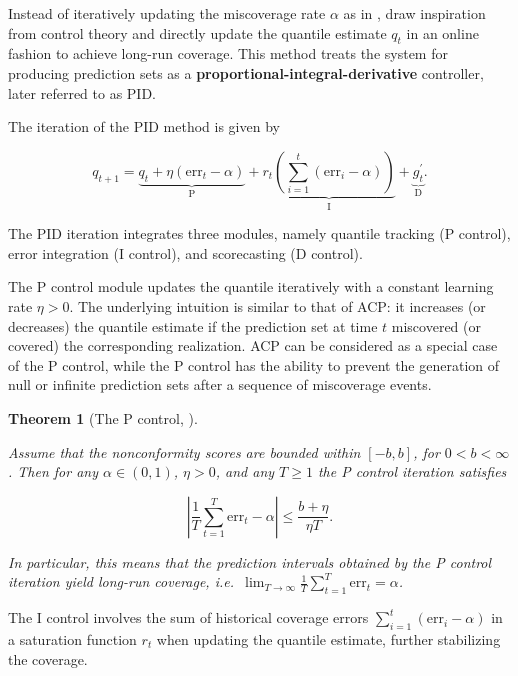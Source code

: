 \documentclass[
  11pt,
  a4paper,
]{article}
\theoremstyle{plain}
\theoremstyle{plain}
\newtheorem{theorem}{Theorem}[section]
\theoremstyle{remark}
\begin{document}
Instead of iteratively updating the miscoverage rate \(\alpha\) as in
\textcite{gibbs2021}, \textcite{angelopoulos2024} draw inspiration from
control theory and directly update the quantile estimate \(q_t\) in an
online fashion to achieve long-run coverage. This method treats the
system for producing prediction sets as a
\textbf{proportional-integral-derivative} controller, later referred to
as PID.

The iteration of the PID method is given by

\[
q_{t+1}=\underbrace{q_t+\eta\left(\mathrm{err}_t-\alpha\right)}_{\mathrm{P}}+\underbrace{r_t\left(\sum_{i=1}^t \left(\mathrm{err}_i-\alpha\right)\right)}_{\mathrm{I}}+\underbrace{g_t^{\prime}}_{\mathrm{D}}.
\]

The PID iteration integrates three modules, namely quantile tracking (P
control), error integration (I control), and scorecasting (D control).

The P control module updates the quantile iteratively with a constant
learning rate \(\eta > 0\). The underlying intuition is similar to that
of ACP: it increases (or decreases) the quantile estimate if the
prediction set at time \(t\) miscovered (or covered) the corresponding
realization. ACP can be considered as a special case of the P control,
while the P control has the ability to prevent the generation of null or
infinite prediction sets after a sequence of miscoverage events.

\begin{theorem}[The P control,
\textcite{angelopoulos2024}]\protect\hypertarget{thm-pid_p}{}\label{thm-pid_p}

Assume that the nonconformity scores are bounded within \([-b, b]\), for
\(0<b<\infty\). Then for any \(\alpha \in (0,1)\), \(\eta > 0\), and any
\(T \geq 1\) the P control iteration satisfies

\[
|\frac{1}{T}\sum_{t=1}^{T}\mathrm{err}_t - \alpha| \leq \frac{b+\eta}{\eta T}.
\]

In particular, this means that the prediction intervals obtained by the
P control iteration yield long-run coverage,
i.e.~\(\lim _{T \rightarrow \infty} \frac{1}{T} \sum_{t=1}^T \mathrm{err}_t = \alpha\).

\end{theorem}

The I control involves the sum of historical coverage errors
\(\sum_{i=1}^t (\mathrm{err}_i-\alpha)\) in a saturation function
\(r_t\) when updating the quantile estimate, further stabilizing the
coverage.
\end{document}
